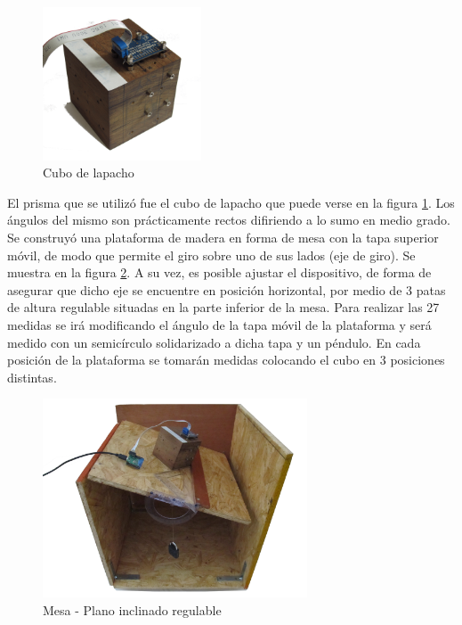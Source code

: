 \documentclass[main]{subfiles}
\begin{document}
\begin{figure}
  \vspace{-20pt}
  \begin{center}
    \includegraphics[width=0.42\textwidth]{./pics_acc/cubo.png}
  \end{center}
  \vspace{-20pt}
  \caption{Cubo de lapacho}
  \label{fig:cubo}
\end{figure}

El prisma que se utilizó fue el cubo de lapacho que puede verse en la figura \ref{fig:cubo}. Los ángulos del mismo son prácticamente rectos difiriendo a lo sumo en medio grado. \\

Se construy\'o una plataforma de madera en forma de mesa con la tapa superior móvil, de modo que permite el giro sobre uno de sus lados (eje de giro). Se muestra en la figura \ref{fig:mesa-flotando}.  A su vez, es posible ajustar el dispositivo, de forma de asegurar que dicho eje se encuentre en posición horizontal, por medio de 3 patas de altura regulable situadas en la parte inferior de la mesa. Para realizar las 27 medidas se irá modificando el ángulo de la tapa móvil de la plataforma y será medido con un semicírculo solidarizado a dicha tapa y un péndulo. En cada posición de la plataforma se tomarán medidas colocando el cubo en 3 posiciones distintas.

\begin{figure}[h!]
	\begin{center}
		\includegraphics[width=0.7\textwidth]{./pics_acc/mesa-flotando.jpg}
	\end{center}
	\vspace{-20pt}
	\caption{Mesa - Plano inclinado regulable}
	\label{fig:mesa-flotando}
\end{figure}
\end{document}
